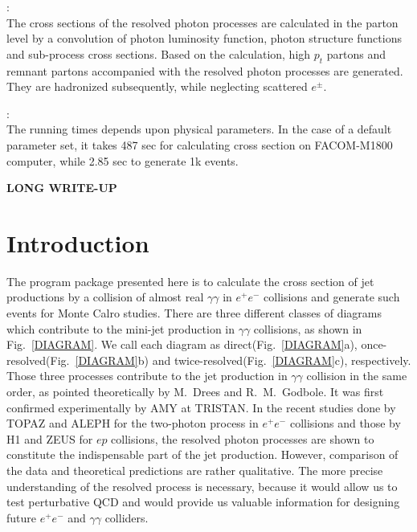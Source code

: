 \vglue 12pt

: \\ 
The cross sections of the resolved photon processes
are calculated in the parton level 
by a convolution of photon luminosity function,
photon structure functions and sub-process cross sections.
Based on the calculation, high $p_t$ partons
and remnant partons 
accompanied with the resolved photon processes are generated.
They are hadronized subsequently, while neglecting scattered
$e^\pm$.
\vglue 12pt

: \\
The running times depends upon physical parameters.
In the case of a default parameter set, it
takes 487 sec for calculating
cross section on FACOM-M1800 computer,
while 2.85 sec to generate 1k events.
\vglue 12pt


%
%

\centerline{\bf LONG WRITE-UP}

\section{Introduction}

The program package presented here is to calculate the
cross section of jet productions by a
collision of almost real $\gamma\gamma$ 
in $e^+e^-$ collisions 
and generate such events for Monte Calro studies.
There are three different classes of diagrams
which contribute to the mini-jet production in 
$\gamma\gamma$ collisions,
as shown in Fig.~\ref{DIAGRAM}.
We call each diagram as direct(Fig.~\ref{DIAGRAM}a),
once-resolved(Fig.~\ref{DIAGRAM}b) and 
twice-resolved(Fig.~\ref{DIAGRAM}c), respectively.
Those three processes contribute to the jet production in
$\gamma\gamma$ collision in the same order,
as pointed theoretically by M.~Drees and R.~M.~Godbole\cite{DREESA}.
It was first confirmed experimentally by AMY\cite{AMY}
at TRISTAN.  In the recent studies done by TOPAZ\cite{TOPAZ93B,HAYASHII}
and ALEPH\cite{ALEPH93} for the two-photon 
process in $e^+e^-$ collisions and those by
H1\cite{H1} and ZEUS\cite{ZEUS} for 
$ep$ collisions, the resolved photon processes are shown to 
constitute the indispensable part of the jet production.
However, comparison of the data and theoretical predictions
are rather qualitative.  
The more precise understanding of the resolved process
is necessary, because it would allow us to test perturbative 
QCD\cite{QCDTEST}
and would provide us valuable information for designing future
$e^+e^-$ and $\gamma\gamma$ 
colliders\cite{MIYAMOTO92,LCBACKGROUND}.

